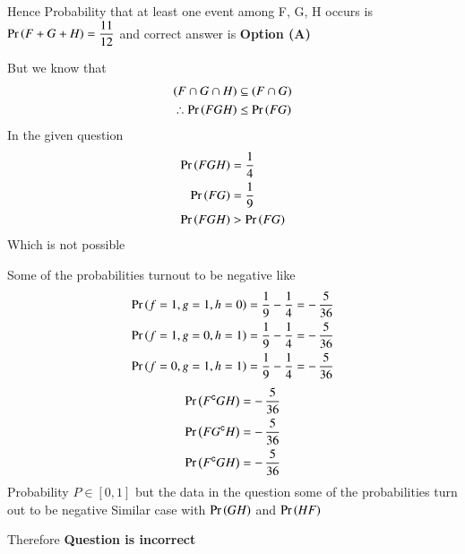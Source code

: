 \documentclass[journal,12pt,twocolumn]{IEEEtran}
\begin{document}
Hence Probability that at least one event among F, G, H occurs is $\Pr\left(F + G + H\right)=\dfrac{11}{12}$ and correct answer is \textbf{Option (A)}
\null \par
But we know that 
\begin{align*}
(F \cap G \cap H)     &\subseteq (F \cap G) \\
\therefore \Pr\left(F G H\right) &\leq \Pr\left(F G\right) 
\end{align*}
In the given question 
\begin{align*}
\Pr\left(F G H\right) &= \dfrac{1}{4} \\
\Pr\left(F G\right)   &= \dfrac{1}{9} \\
\Pr\left(F G H\right) &> \Pr\left(F G\right)
\end{align*}
Which is not possible

Some of the probabilities turnout to be negative like 
\begin{align*}
\Pr\left(f=1,g=1,h=0\right) &= \dfrac{1}{9} - \dfrac{1}{4} = -\,\dfrac{5}{36} \\
\Pr\left(f=1,g=0,h=1\right) &= \dfrac{1}{9} - \dfrac{1}{4} = -\,\dfrac{5}{36} \\
\Pr\left(f=0,g=1,h=1\right) &= \dfrac{1}{9} - \dfrac{1}{4} = -\,\dfrac{5}{36} 
\end{align*}
\begin{align*}
\Pr\left(F^{\mathsf{c}} G H\right)  &= -\,\dfrac{5}{36} \\
\Pr\left(F G^{\mathsf{c}} H\right)  &= -\,\dfrac{5}{36} \\
\Pr\left(F^{\mathsf{c}} G H\right)  &= -\,\dfrac{5}{36}  
\end{align*}
Probability $P\in [0,1]$ but the data in the question some of the probabilities turn out to be negative
Similar case with $\Pr\left(G H\right)$ and $\Pr\left(H F\right)$ 

Therefore \textbf{Question is incorrect}
\end{document}
